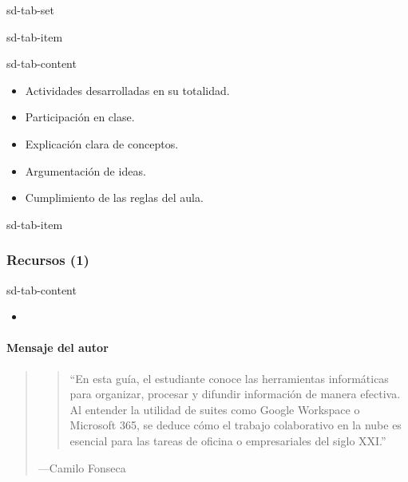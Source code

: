 \documentclass[letterpaper,10pt,spanish]{sphinxmanual}
\begin{document}
\begin{sphinxuseclass}{sd-tab-set}
\begin{sphinxuseclass}{sd-tab-item}
\begin{sphinxuseclass}{sd-tab-content}\begin{itemize}
\item {} 
\sphinxAtStartPar
Actividades desarrolladas en su totalidad.

\item {} 
\sphinxAtStartPar
Participación en clase.

\item {} 
\sphinxAtStartPar
Explicación clara de conceptos.

\item {} 
\sphinxAtStartPar
Argumentación de ideas.

\item {} 
\sphinxAtStartPar
Cumplimiento de las reglas del aula.

\end{itemize}

\end{sphinxuseclass}
\end{sphinxuseclass}
\begin{sphinxuseclass}{sd-tab-item}\subsubsection*{Recursos (1)}

\begin{sphinxuseclass}{sd-tab-content}\begin{itemize}
\item {} 
\sphinxAtStartPar
{\hyperref[\detokenize{cursos/ofimatica10/recursos/T01::doc}]{}}

\end{itemize}

\end{sphinxuseclass}
\end{sphinxuseclass}
\end{sphinxuseclass}

\paragraph{Mensaje del autor}
\label{\detokenize{cursos/ofimatica10/periodo01/G01:mensaje-del-autor}}\begin{quote}
\begin{quote}

\sphinxAtStartPar
“En esta guía, el estudiante conoce las herramientas informáticas para organizar, procesar y difundir información de manera efectiva. Al entender la utilidad de suites como Google Workspace o Microsoft 365, se deduce cómo el trabajo colaborativo en la nube es esencial para las tareas de oficina o empresariales del siglo XXI.”
\end{quote}

\begin{flushright}
---Camilo Fonseca
\end{flushright}
\end{quote}
\end{document}

